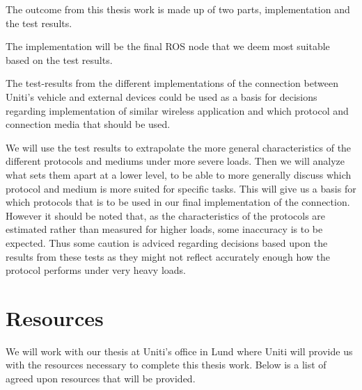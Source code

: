 \documentclass[a4paper]{article}
\begin{document}

The outcome from this thesis work is made up of two parts, implementation and
the test results.

The implementation will be the final ROS node that we deem most suitable based
on the test results.

The test-results from the different implementations of the connection between
Uniti's vehicle and external devices could be used as a basis for decisions
regarding implementation of similar wireless application and which protocol
and connection media that should be used.

We will use the test results to extrapolate the more general characteristics of
the different protocols and mediums under more severe loads. Then we will
analyze what sets them apart at a lower level, to be able to more generally
discuss which protocol and medium is more suited for specific tasks. This will
give us a basis for which protocols that is to be used in our final
implementation of the connection. However it should be noted that, as the
characteristics of the protocols are estimated rather than measured for higher
loads, some inaccuracy is to be expected. Thus some caution is adviced regarding
decisions based upon the results from these tests as they might not reflect
accurately enough how the protocol performs under very heavy loads.


\section{Resources}


We will work with our thesis at Uniti's office in Lund where Uniti will provide
us with the resources necessary to complete this thesis work. Below is a list of
agreed upon resources that will be provided.
\end{document}
